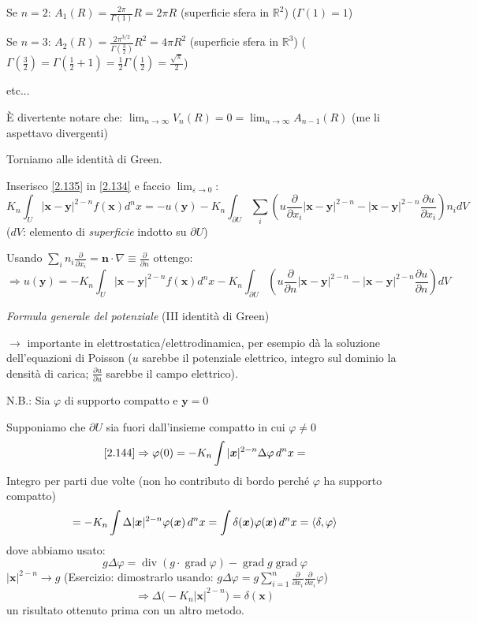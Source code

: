 \documentclass[a4paper,11pt]{report}
\newcommand{\vect}[1]{\boldsymbol{#1}}
\newcommand{\R}{\mathbb{R}}
\newcommand{\x}{\boldsymbol{x}}
\newcommand{\y}{\boldsymbol{y}}
\begin{document}
Se $n=2$: $A_1(R)=\frac{2\pi}{\Gamma(1)} R=2\pi R$ (superficie sfera in $\R^2$) ($\Gamma(1)=1$)

Se $n=3$: $A_2(R)=\frac{2\pi^{3/2}}{\Gamma\left(\frac{3}{2}\right)}R^2=4\pi R^2$ (superficie sfera in $\R^3$) ($\Gamma(\frac{3}{2})=\Gamma(\frac{1}{2}+1)=\frac{1}{2}\Gamma(\frac{1}{2})=\frac{\sqrt{\pi}}{2}$)

etc...

\`E divertente notare che: $\lim_{n\to \infty} V_n(R)=0=\lim_{n\to \infty}A_{n-1}(R)$ (me li aspettavo divergenti)

\medskip

Torniamo alle identit\`a di Green.

Inserisco \eqref{2.135} in \eqref{2.134} e faccio $\lim_{\varepsilon\to 0}$:
\[
K_n\int_U |\x - \y|^{2-n}f(\x)d^nx=-u(\y) - K_n\int_{\partial U}\sum_i \left(u\frac{\partial}{\partial x_i}|\x - \y|^{2-n} - |\x - \y|^{2-n} \frac{\partial u}{\partial x_i} \right)n_i dV
\]
($dV$: elemento di \emph{superficie} indotto su $\partial U$)

Usando $\sum_i n_i \frac{\partial}{\partial x_i}=\vect{n}\cdot\nabla\equiv\frac{\partial}{\partial n}$ ottengo:
\begin{equation}
\Rightarrow u(\y)=-K_n\int_U |\x - \y|^{2-n}f(\x) d^n x - K_n\int_{\partial U} \left(u\frac{\partial}{\partial n}|\x - \y|^{2-n} - |\x - \y|^{2-n} \frac{\partial u}{\partial n} \right)dV
\label{2.144}
\end{equation}
\centerline{\emph{Formula generale del potenziale} (III identit\`a di Green)}

\smallskip

$\rightarrow$ importante in elettrostatica/elettrodinamica, per esempio d\`a la soluzione dell'equazioni di Poisson ($u$ sarebbe il potenziale elettrico, integro sul dominio la densit\`a di carica; $\frac{\partial u}{\partial u}$ sarebbe il campo elettrico).

\medskip

N.B.: Sia $\varphi$ di supporto compatto e $\y=0$

Supponiamo che $\partial U$ sia fuori dall'insieme compatto in cui $\varphi \neq 0$
\[
\eqref{2.144} \Rightarrow \varphi(0)=-K_n\int |\x|^{2-n}\Delta \varphi \, d^n x=
\]
Integro per parti due volte (non ho contributo di bordo perch\'e $\varphi$ ha supporto compatto)
\[
=-K_n\int \Delta |\x|^{2-n} \varphi(\x) \, d^nx=\int \delta(\x)\varphi(\x) \, d^n x=\braket{\delta,\varphi}
\]
dove abbiamo usato:
\[
g\Delta\varphi=\operatorname{div} (g\cdot \operatorname{grad}\varphi)-\operatorname{grad} g \operatorname{grad} \varphi 
\]
$|\x|^{2-n} \rightarrow g$ (Esercizio: dimostrarlo usando: $g\Delta\varphi=g\sum_{i=1}^n \frac{\partial}{\partial x_i} \frac{\partial}{\partial x_i}\varphi$)
\begin{equation}
\Rightarrow \Delta\big(-K_n|\x|^{2-n}\big)=\delta(\x)
\label{2.145}
\end{equation}
un risultato ottenuto prima con un altro metodo.  %
\end{document}
